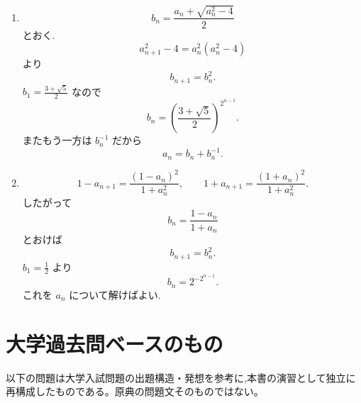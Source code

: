 \begin{enumerate}[label=\textbf{問\arabic*.},leftmargin=3.8em,format=\bookitemlink{practice-advanced}{solution}{problem}]
              また
          \[
            b_1=\frac{2-\sqrt3}{2+\sqrt3}=(2-\sqrt3)^2.
          \]
              よって
          \[
            b_n=(2-\sqrt3)^{2^n}.
          \]
              最後に \(a_n\) について解く.
        \item \[
            b_n=\frac{a_n+\sqrt{a_n^2-4}}2
          \]
              とおく.
          \[
            a_{n+1}^2-4=a_n^2(a_n^2-4)
          \]
              より
          \[
            b_{n+1}=b_n^2.
          \]
              \(b_1=\displaystyle \frac{3+\sqrt5}{2}\) なので
          \[
            b_n=\left(\frac{3+\sqrt5}{2}\right)^{2^{n-1}}.
          \]
              またもう一方は \(b_n^{-1}\) だから
          \[
            a_n=b_n+b_n^{-1}.
          \]
        \item \[
            1-a_{n+1}
            =\frac{(1-a_n)^2}{1+a_n^2},
            \qquad
            1+a_{n+1}
            =\frac{(1+a_n)^2}{1+a_n^2}.
          \]
              したがって
          \[
            b_n=\frac{1-a_n}{1+a_n}
          \]
              とおけば
          \[
            b_{n+1}=b_n^2.
          \]
              \(b_1=\displaystyle \frac{1}{2}\) より
          \[
            b_n=2^{-2^{n-1}}.
          \]
              これを \(a_n\) について解けばよい.
      \end{enumerate}


  \section{大学過去問ベースのもの}\label{節：大学過去問ベースのもの}
    以下の問題は大学入試問題の出題構造・発想を参考に,本書の演習として独立に再構成したものである。原典の問題文そのものではない。

